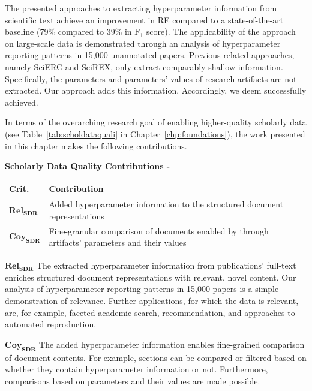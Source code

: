 The presented approaches to extracting hyperparameter information from scientific text achieve an improvement in RE compared to a state-of-the-art baseline (79\% compared to 39\% in $\text{F}_1$ score). The applicability of the approach on large-scale data is demonstrated through an analysis of hyperparameter reporting patterns in 15,000 unannotated papers. Previous related approaches, namely SciERC and SciREX, only extract comparably shallow information. Specifically, the parameters and parameters' values of research artifacts are not extracted. Our approach adds this information. Accordingly, we deem  successfully achieved.

In terms of the overarching research goal of enabling higher-quality scholarly data (see Table~\ref{tab:scholdataquali} in Chapter~\ref{chp:foundations}), the work presented in this chapter makes the following contributions.

\begin{infobox-progress}
      \textbf{Scholarly Data Quality Contributions - \cite{Saier2023hyperpie}}

      \begin{tabular}{lp{10.9cm}}
        \toprule
        Crit. & Contribution \\
        \midrule
        $\mathbf{Rel_{SDR}}$ & Added hyperparameter information to the structured document representations \\
        $\mathbf{Coy_{SDR}}$ & Fine-granular comparison of documents enabled by through artifacts' parameters and their values \\
        \bottomrule
      \end{tabular}
\end{infobox-progress}

$\mathbf{Rel_{SDR}}$ The extracted hyperparameter information from publications' full-text enriches structured document representations with relevant, novel content. Our analysis of hyperparameter reporting patterns in 15,000 papers is a simple demonstration of relevance. Further applications, for which the data is relevant, are, for example, faceted academic search, recommendation, and approaches to automated reproduction.

$\mathbf{Coy_{SDR}}$ The added hyperparameter information enables fine-grained comparison of document contents. For example, sections can be compared or filtered based on whether they contain hyperparameter information or not. Furthermore, comparisons based on parameters and their values are made possible.
